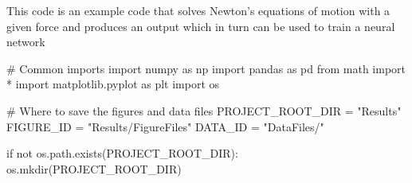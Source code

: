 \documentclass[%
oneside,                 %
final,                   %
10pt]{article}
\begin{document}
This code is an example code that solves Newton's equations of motion
with a given force and produces an output which in turn can be used to
train a neural network































































































\bpycod
# Common imports
import numpy as np
import pandas as pd
from math import *
import matplotlib.pyplot as plt
import os

# Where to save the figures and data files
PROJECT_ROOT_DIR = "Results"
FIGURE_ID = "Results/FigureFiles"
DATA_ID = "DataFiles/"

if not os.path.exists(PROJECT_ROOT_DIR):
    os.mkdir(PROJECT_ROOT_DIR)
\end{document}
